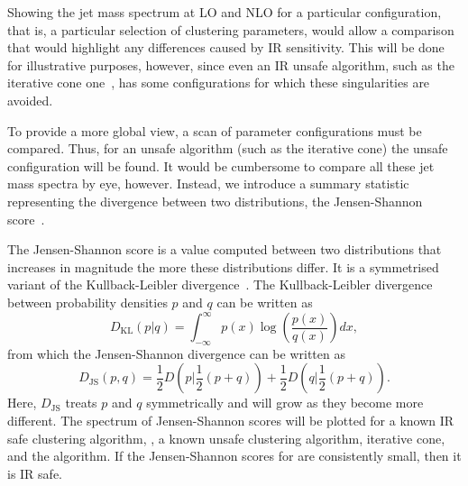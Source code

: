     Showing the jet mass spectrum at LO and NLO for a particular configuration,
    that is, a particular selection of clustering parameters,
    would allow a comparison that would highlight any differences caused by IR sensitivity.
    This will be done for illustrative purposes,
    however, since even an IR unsafe algorithm, such as the iterative cone one~\cite{Cacciari:2008gp},
     has some configurations for which these singularities are avoided.

    To provide a more global view, a scan of parameter configurations must be compared.
    Thus, for an unsafe algorithm (such as the iterative cone) the unsafe configuration
    will be found.
    It would be cumbersome to compare all these jet mass spectra by eye, however.
    Instead, we introduce a summary statistic representing the divergence between two distributions,
    the Jensen-Shannon score~\cite{Lin:1991zzm}.

    The Jensen-Shannon score is a value computed between two distributions that increases in magnitude the more these distributions differ.
    It is a symmetrised variant of the Kullback-Leibler divergence~\cite{Lin:1991zzm}.
    The Kullback-Leibler divergence between probability densities \(p\) and \(q\) can be written as
    \begin{equation}
    D_\text{KL} (p | q) = \int^{\infty}_{-\infty} p(x) \log\left(\frac{p(x)}{q(x)}\right) dx,
\end{equation}
    from which the Jensen-Shannon divergence can be written as
    \begin{equation}
    D_\text{JS}(p, q) = \frac{1}{2}D\left(p | \frac{1}{2}(p + q)\right) + \frac{1}{2}D\left(q | \frac{1}{2}(p + q)\right).
\end{equation}
    Here, \(D_\text{JS}\) treats \(p\) and \(q\) symmetrically and will grow as they become more different.
    The spectrum of Jensen-Shannon scores will be plotted for a known IR safe clustering algorithm, \genkt{},
    a known unsafe clustering algorithm, iterative cone, and the \spectral{} algorithm.
    If the Jensen-Shannon scores for \spectral{} are consistently small,
    then it is IR safe.

